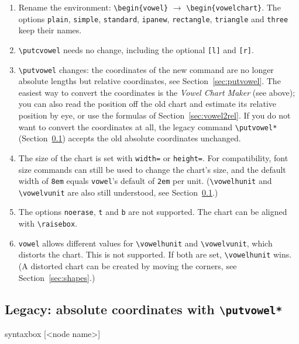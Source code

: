 \documentclass[a4paper,11pt]{article}
\newcommand\cmd[1]{\texttt{\textbackslash #1}}
\newcommand\opt[1]{\texttt{#1}}
\newcommand\pkg[1]{\texttt{#1}}
\begin{document}
\begin{enumerate}
	\item
		Rename the environment: \verb|\begin{vowel}| $\to$ \verb|\begin{vowelchart}|.
		The options \opt{plain}, \opt{simple}, \opt{standard}, \opt{ipanew}, \opt{rectangle}, \opt{triangle} and \opt{three} keep their names.
	\item
		\cmd{putcvowel} needs no change, including the optional \texttt{[l]} and \texttt{[r]}.
	\item
		\cmd{putvowel} changes: the coordinates of the new command are no longer absolute lengths but relative coordinates, see Section~\ref{sec:putvowel}.
		The easiest way to convert the coordinates is the \textit{Vowel Chart Maker} (see above); you can also read the position off the old chart and estimate its relative position by eye, or use the formulas of Section~\ref{sec:vowel2rel}.
		If you do not want to convert the coordinates at all, the legacy command \cmd{putvowel*} (Section~\ref{sec:legacy}) accepts the old absolute coordinates unchanged.
	\item
		The size of the chart is set with \opt{width=} or \opt{height=}. For compatibility, font size commands can still be used to change the chart’s size, and the default width of \texttt{8em} equals \pkg{vowel}’s default of \texttt{2em} per unit. (\cmd{vowelhunit} and \cmd{vowelvunit} are also still understood, see Section~\ref{sec:legacy}.)
	\item
		The options \opt{noerase}, \opt{t} and \opt{b} are not supported. The chart can be aligned with \cmd{raisebox}.
	\item
		\pkg{vowel} allows different values for \cmd{vowelhunit} and \cmd{vowelvunit}, which distorts the chart. This is not supported. If both are set, \cmd{vowelhunit} wins. (A distorted chart can be created by moving the corners, see Section~\ref{sec:shapes}.)
\end{enumerate}




\needspace{5em}
\subsection{Legacy: absolute coordinates with \cmd{putvowel*}}\label{sec:legacy}

\begin{tcblisting}{syntaxbox}
[<node name>]
\end{tcblisting}
\end{document}
